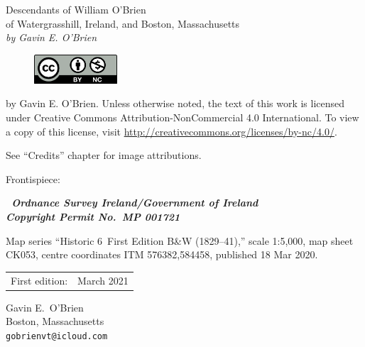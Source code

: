 \documentclass[ebook]{memoir}
\begin{document}
\clearpage

{\begingroup%
	\centering
	\vspace*{0.1\textheight}
	{\Huge Descendants of William O'Brien}\\[\baselineskip]
	{\LARGE of Watergrasshill, Ireland, and Boston, Massachusetts}\\[\baselineskip]
	{\large\itshape by Gavin E. O'Brien}\\[\baselineskip]
	\vfill
	\endgroup}
\clearpage

\begingroup
\footnotesize
\parindent 0pt
\parskip \baselineskip
\vspace*{\fill}
\begin{figure}[h]
	\includegraphics[width=88pt]{by-nc}
\end{figure}
 by Gavin E. O'Brien. Unless otherwise noted, the text of this work is licensed under Creative Commons Attribution-NonCommercial 4.0 International. To view a copy of this license, visit \url{http://creativecommons.org/licenses/by-nc/4.0/}.

See ``Credits'' chapter for image attributions.

Frontispiece:

{ 
\centering
\textbf{\textit{
		\textcopyright\ Ordnance Survey Ireland/Government of Ireland\\Copyright Permit No.\ MP 001721
	}}\par
}
	
Map series ``Historic 6\textquotedbl\ First Edition B\&W (1829--41),'' scale 1:5,000, map sheet CK053, centre coordinates ITM 576382,584458, published 18 Mar 2020.

\begin{center}
	\begin{tabular}{ll}
		First edition:  & March 2021 \\
	\end{tabular}
\end{center}

Gavin E.\ O'Brien\\
Boston, Massachusetts\\
\texttt{gobrienvt@icloud.com}

\vspace*{2\baselineskip}

\endgroup
\clearpage
\pagestyle{headings}
\end{document}
